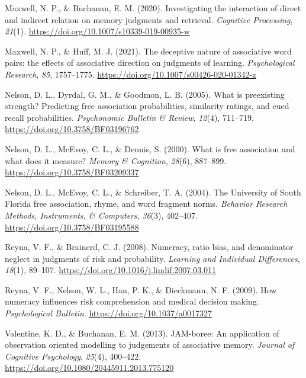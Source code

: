 \documentclass[
  man,floatsintext]{apa7}
\newlength{\cslhangindent}
\newenvironment{CSLReferences}[2] %
 {\begin{list}{}{%
  \setlength{\itemindent}{0pt}
  \setlength{\leftmargin}{0pt}
  \setlength{\parsep}{0pt}
  \ifodd #1
   \setlength{\leftmargin}{\cslhangindent}
   \setlength{\itemindent}{-1\cslhangindent}
  \fi
  \setlength{\itemsep}{#2\baselineskip}}}
 {\end{list}}
\begin{document}
\begin{CSLReferences}{1}{0}
Maxwell, N. P., \& Buchanan, E. M. (2020). Investigating the interaction of direct and indirect relation on memory judgments and retrieval. \emph{Cognitive Processing}, \emph{21}(1). \url{https://doi.org/10.1007/s10339-019-00935-w}

Maxwell, N. P., \& Huff, M. J. (2021). The deceptive nature of associative word pairs: the effects of associative direction on judgments of learning. \emph{Psychological Research}, \emph{85}, 1757--1775. \url{https://doi.org/10.1007/s00426-020-01342-z}

Nelson, D. L., Dyrdal, G. M., \& Goodmon, L. B. (2005). {What is preexisting strength? Predicting free association probabilities, similarity ratings, and cued recall probabilities}. \emph{Psychonomic Bulletin {\&} Review}, \emph{12}(4), 711--719. \url{https://doi.org/10.3758/BF03196762}

Nelson, D. L., McEvoy, C. L., \& Dennis, S. (2000). {What is free association and what does it measure?} \emph{Memory {\&} Cognition}, \emph{28}(6), 887--899. \url{https://doi.org/10.3758/BF03209337}

Nelson, D. L., McEvoy, C. L., \& Schreiber, T. A. (2004). The University of South Florida free association, rhyme, and word fragment norms. \emph{Behavior Research Methods, Instruments, \& Computers}, \emph{36}(3), 402--407. \url{https://doi.org/10.3758/BF03195588}

Reyna, V. F., \& Brainerd, C. J. (2008). Numeracy, ratio bias, and denominator neglect in judgments of risk and probability. \emph{Learning and Individual Differences}, \emph{18}(1), 89--107. \url{https://doi.org/10.1016/j.lindif.2007.03.011}

Reyna, V. F., Nelson, W. L., Han, P. K., \& Dieckmann, N. F. (2009). How numeracy influences risk comprehension and medical decision making. \emph{Psychological Bulletin}. \url{https://doi.org/10.1037/a0017327}

Valentine, K. D., \& Buchanan, E. M. (2013). {JAM-boree: An application of observation oriented modelling to judgements of associative memory}. \emph{Journal of Cognitive Psychology}, \emph{25}(4), 400--422. \url{https://doi.org/10.1080/20445911.2013.775120}

\end{CSLReferences}
\end{document}
